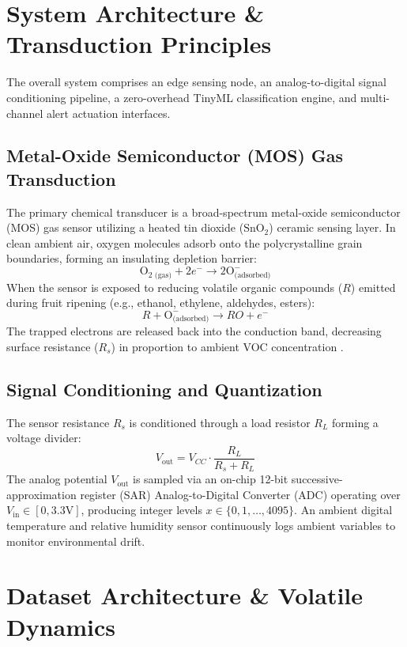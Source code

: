 \documentclass[conference]{IEEEtran}
\begin{document}
\section{System Architecture \& Transduction Principles}
The overall system comprises an edge sensing node, an analog-to-digital signal conditioning pipeline, a zero-overhead TinyML classification engine, and multi-channel alert actuation interfaces.

\subsection{Metal-Oxide Semiconductor (MOS) Gas Transduction}
The primary chemical transducer is a broad-spectrum metal-oxide semiconductor (MOS) gas sensor utilizing a heated tin dioxide ($\text{SnO}_2$) ceramic sensing layer. In clean ambient air, oxygen molecules adsorb onto the polycrystalline grain boundaries, forming an insulating depletion barrier:
\begin{equation}
\text{O}_{2\text{ (gas)}} + 2e^- \longrightarrow 2\text{O}^-_{\text{(adsorbed)}}
\end{equation}
When the sensor is exposed to reducing volatile organic compounds ($R$) emitted during fruit ripening (e.g., ethanol, ethylene, aldehydes, esters):
\begin{equation}
R + \text{O}^-_{\text{(adsorbed)}} \longrightarrow RO + e^-
\end{equation}
The trapped electrons are released back into the conduction band, decreasing surface resistance ($R_s$) in proportion to ambient VOC concentration \cite{yamazoe2005}.

\subsection{Signal Conditioning and Quantization}
The sensor resistance $R_s$ is conditioned through a load resistor $R_L$ forming a voltage divider:
\begin{equation}
V_{\text{out}} = V_{CC} \cdot \frac{R_L}{R_s + R_L}
\end{equation}
The analog potential $V_{\text{out}}$ is sampled via an on-chip 12-bit successive-approximation register (SAR) Analog-to-Digital Converter (ADC) operating over $V_{\text{in}} \in [0, 3.3\text{V}]$, producing integer levels $x \in \{0, 1, \dots, 4095\}$. An ambient digital temperature and relative humidity sensor continuously logs ambient variables to monitor environmental drift.

\section{Dataset Architecture \& Volatile Dynamics}
\end{document}
